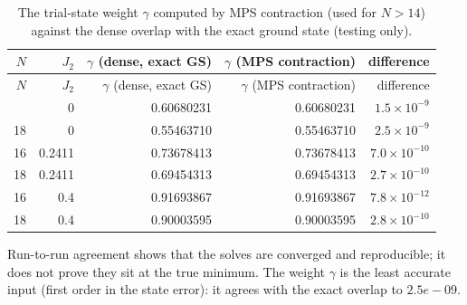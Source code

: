 \documentclass[11pt]{article}
\begin{document}
{\small
\begin{longtable}{rrrrr}
\caption{The trial-state weight $\gamma$ computed by MPS contraction (used for $N>14$) against the dense overlap with the exact ground state (testing only).}\label{tab:gam}\\
\toprule
$N$ & $J_2$ & $\gamma$ (dense, exact GS) & $\gamma$ (MPS contraction) & difference \\
\midrule
\endfirsthead
\toprule
$N$ & $J_2$ & $\gamma$ (dense, exact GS) & $\gamma$ (MPS contraction) & difference \\
\midrule
\endhead
\bottomrule
\endfoot
16 & 0 & 0.60680231 & 0.60680231 & $1.5\times10^{-9}$ \\
18 & 0 & 0.55463710 & 0.55463710 & $2.5\times10^{-9}$ \\
16 & 0.2411 & 0.73678413 & 0.73678413 & $7.0\times10^{-10}$ \\
18 & 0.2411 & 0.69454313 & 0.69454313 & $2.7\times10^{-10}$ \\
16 & 0.4 & 0.91693867 & 0.91693867 & $7.8\times10^{-12}$ \\
18 & 0.4 & 0.90003595 & 0.90003595 & $2.8\times10^{-10}$ \\
\end{longtable}
}

Run-to-run agreement shows that the solves are converged and reproducible; it does not prove they sit at the true minimum. The weight $\gamma$ is the least accurate input (first order in the state error): it agrees with the exact overlap to $2.5e-09$.
\end{document}
